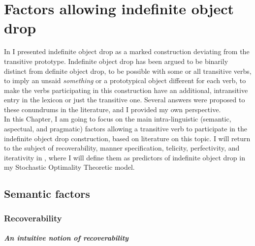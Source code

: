 \setchapterpreamble[u]{\margintoc}
\chapter{Factors allowing indefinite object drop}

In  I presented indefinite object drop as a marked construction deviating from the transitive prototype. Indefinite object drop has been argued to be binarily distinct from definite object drop, to be possible with some or all transitive verbs, to imply an unsaid \textit{something} or a prototypical object different for each verb, to make the verbs participating in this construction have an additional, intransitive entry in the lexicon or just the transitive one. Several answers were proposed to these conundrums in the literature, and I provided my own perspective.\\
In this Chapter, I am going to focus on the main intra-linguistic (semantic, aspectual, and pragmatic) factors allowing a transitive verb to participate in the indefinite object drop construction, based on literature on this topic. I will return to the subject of recoverability, manner specification, telicity, perfectivity, and iterativity in , where I will define them as predictors of indefinite object drop in my Stochastic Optimality Theoretic model.


\section{Semantic factors} 

\subsection{Recoverability} 

\paragraph{An intuitive notion of recoverability}

